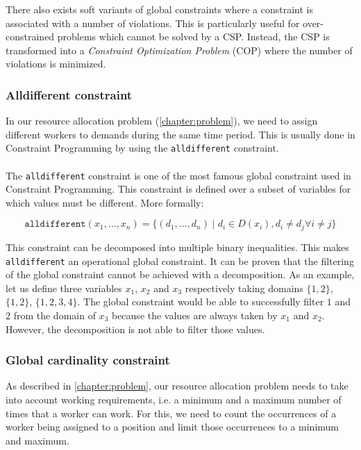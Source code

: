 \documentclass[../../thesis.tex]{subfiles}
\begin{document}
There also exists soft variants \cite{Regin:2000} of global constraints where a constraint is associated with 
a number of violations. This is particularly useful for over-constrained problems which cannot be solved by a CSP.
Instead, the CSP is transformed into a \emph{Constraint Optimization Problem} (COP) where the number of violations is minimized.
\subsubsection{Alldifferent constraint}
\label{sota:alldifferent}

In our resource allocation problem (\autoref{chapter:problem}), we need to assign different workers to demands during the same time period. 
This is usually done in Constraint Programming by using the \texttt{alldifferent} constraint.

\paragraph{}

The \texttt{alldifferent} constraint \cite{Rgin1994AFA} is one of the most famous global constraint used in Constraint 
Programming.
This constraint is defined over a subset of variables for which values must be different. More formally:

\begin{equation*}
  \texttt{alldifferent}(x_1, \dots, x_n) = \{ (d_1, \dots, d_n) \mid d_i \in D(x_i), d_i \neq d_j \forall i \neq j \}
\end{equation*}

This constraint can be decomposed into multiple binary inequalities. This makes \texttt{alldifferent} an operational global constraint.
It can be proven that the filtering of the global constraint cannot be achieved with a decomposition. As 
an example, let us define three variables $x_1$, $x_2$ and $x_3$ respectively taking domains $\{1,2\}$, $\{1,2\}$, $\{1,2,3,4\}$. 
The global constraint would be able to successfully filter $1$ and $2$ from the domain of 
$x_3$ because the values are always taken by $x_1$ and $x_2$. However, the decomposition is not able to filter those values.


\subsubsection{Global cardinality constraint}
\label{sota:gcc}

As described in \autoref{chapter:problem}, our resource allocation problem needs to take into account working requirements, i.e. a minimum 
and a maximum number of times that a worker can work. For this, we need to count the occurrences of a worker being assigned to a position and 
limit those occurrences to a minimum and maximum. 
\end{document}
